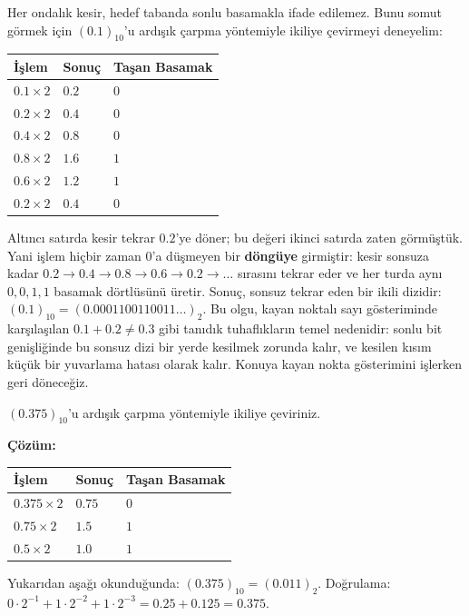 \begin{bilginot}
Her ondalık kesir, hedef tabanda sonlu basamakla ifade edilemez. Bunu somut görmek için
$(0.1)_{10}$'u ardışık çarpma yöntemiyle ikiliye çevirmeyi deneyelim:
\begin{center}
\begin{tabular}{lll}
\toprule
İşlem & Sonuç & Taşan Basamak \\
\midrule
$0.1\times2$ & $0.2$ & $0$ \\
$0.2\times2$ & $0.4$ & $0$ \\
$0.4\times2$ & $0.8$ & $0$ \\
$0.8\times2$ & $1.6$ & $1$ \\
$0.6\times2$ & $1.2$ & $1$ \\
$0.2\times2$ & $0.4$ & $0$ \\
\bottomrule
\end{tabular}
\end{center}
Altıncı satırda kesir tekrar $0.2$'ye döner; bu değeri ikinci satırda zaten görmüştük.
Yani işlem hiçbir zaman $0$'a düşmeyen bir \textbf{döngüye} girmiştir: kesir sonsuza kadar
$0.2\to0.4\to0.8\to0.6\to0.2\to\ldots$ sırasını tekrar eder ve her turda aynı $0,0,1,1$
basamak dörtlüsünü üretir. Sonuç, sonsuz tekrar eden bir ikili dizidir:
$(0.1)_{10}=(0.0001100110011\ldots)_2$. Bu olgu, kayan noktalı sayı gösteriminde
karşılaşılan $0.1+0.2\neq0.3$ gibi tanıdık tuhaflıkların temel nedenidir: sonlu bit
genişliğinde bu sonsuz dizi bir yerde kesilmek zorunda kalır, ve kesilen kısım küçük bir
yuvarlama hatası olarak kalır. Konuya kayan nokta gösterimini işlerken geri döneceğiz.
\end{bilginot}

\begin{alistirma}[\kolay]
$(0.375)_{10}$'u ardışık çarpma yöntemiyle ikiliye çeviriniz.
\end{alistirma}

\noindent\textbf{Çözüm:}
\begin{center}
\begin{tabular}{lll}
\toprule
İşlem & Sonuç & Taşan Basamak \\
\midrule
$0.375\times2$ & $0.75$ & $0$ \\
$0.75\times2$ & $1.5$ & $1$ \\
$0.5\times2$ & $1.0$ & $1$ \\
\bottomrule
\end{tabular}
\end{center}
Yukarıdan aşağı okunduğunda: $(0.375)_{10}=(0.011)_2$. Doğrulama:
$0\cdot2^{-1}+1\cdot2^{-2}+1\cdot2^{-3}=0.25+0.125=0.375$. \checkmark

